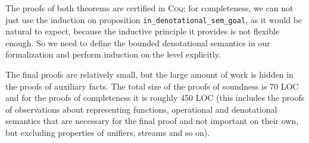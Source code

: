 The proofs of both theorems are certified in \textsc{Coq}; for completeness, we can not just use the induction on proposition \lstinline|in_denotational_sem_goal|, as it would be natural to expect,
because the inductive principle it provides is not flexible enough. So we need to define the bounded denotational semantics in our formalization and perform
induction on the level explicitly.

  The final proofs are relatively small, but the large amount of work is hidden in the proofs of auxiliary facts. The total size of the proofs of soundness is 70 LOC and for the proofs of
  completeness it is roughly 450 LOC (this includes the proofs of observations about representing functions, operational and denotational semantics that are necessary for the final proof
  and not important on their own, but excluding properties of unifiers, streams and so on).

\begin{comment}
\begin{lstlisting}[language=Coq,morekeywords={where,at,level}]
  Reserved Notation "[| n | g , f |]" (at level 0).
  Inductive in_denotational_sem_lev_goal :
    nat -> goal -> repr_fun -> Prop :=
    ...
  | dslgInvoke : forall l r t f,
      [| l  | proj1_sig (Prog r) t , f |] ->
      [| S l | Invoke r t , f |]
  where "[| n | g , f |]" :=
    (in_denotational_sem_lev_goal n g f).
\end{lstlisting}

Recall that the environment ``\lstinline[language=Coq]|Prog|'' maps every relational symbol to the definition of relation,
which is a pair of a function from terms to goals and a proof that it is closed and consistent.
So ``\lstinline[language=Coq]|(proj1_sig (Prog r) t)|'' here simply takes the body of the corresponding relation.

The lemma relating bounded and unbounded denotational semantics in \textsc{Coq} looks as follows:

\begin{lstlisting}[language=Coq] 
  Lemma in_denotational_sem_some_lev:
    forall (g : goal) (f : repr_fun),
      [| g , f |] -> exists l, [| l | g , f |].
\end{lstlisting}

The statements of the theorems are as follows:

\begin{lstlisting}[language=Coq]]
  Theorem search_correctness:
    forall (g : goal) (k : nat) (f : repr_fun) (t : trace),
      closed_goal_in_context (first_nats k) g) ->
      op_sem (State (Leaf g empty_subst k)) t) ->
      {| t , f |} ->
      [| g , f |].
  Theorem search_completeness:
    forall (g : goal) (k : nat) (f : repr_fun) (t : trace),
      consistent_goal g ->
      closed_goal_in_context (first_nats k) g ->
      op_sem (State (Leaf g empty_subst k)) t ->
      [| g , f |] ->
      exists (f' : repr_fun),
        {| t , f' |} /\
        forall (x : var), In x (first_nats k) -> f x = f' x.
\end{lstlisting}
\end{comment}
